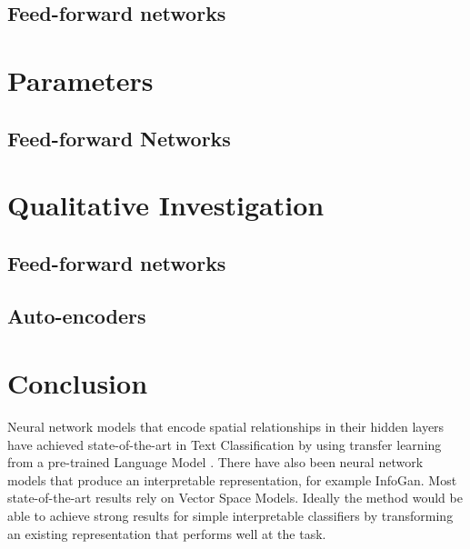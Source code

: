 \subsection{Feed-forward networks}


\section{Parameters}

\subsection{Feed-forward Networks}


\section{Qualitative Investigation}

\subsection{Feed-forward networks}

\subsection{Auto-encoders}

\section{Conclusion}



 Neural network models that encode spatial relationships in their hidden layers have achieved state-of-the-art in Text Classification by using transfer learning from a pre-trained Language Model \cite{Gong2018}. There have also been neural network models that produce an interpretable representation, for example InfoGan.
 Most state-of-the-art results rely on Vector Space Models. Ideally the method would be able to achieve strong results for simple interpretable classifiers by transforming an existing representation that performs well at the task.
 

